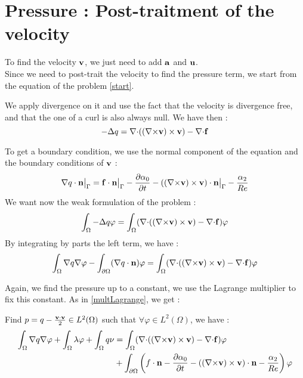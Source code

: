 \section{Pressure : Post-traitment of the velocity}
\label{pressure}
To find the velocity ${\mathbf{v}}$, we just need to add ${\mathbf{a}}$ and ${\mathbf{u}}$.\\
Since we need to post-trait the velocity to find the pressure term, we start from the equation of the problem \ref{start}.

We apply divergence on it and use the fact that the velocity is divergence free, and that the one of a curl is also always null. We have then :
\begin{equation*}
-{\Delta} q = {\nabla\cdot}(({\nabla\times} {\mathbf{v}})\times {\mathbf{v}}) - {\nabla\cdot} {\mathbf{f}}
\end{equation*}

To get a boundary condition, we use the normal component of the equation and the boundary conditions of ${\mathbf{v}}$ :
\[ {\nabla} q\cdot {\mathbf{n}}{\big\rvert_{\Gamma}} =  {\mathbf{f}}\cdot {\mathbf{n}}{\big\rvert_{\Gamma}} - \frac{\partial\alpha_0}{\partial t} - (({\nabla\times} {\mathbf{v}})\times {\mathbf{v}})\cdot {\mathbf{n}}{\big\rvert_{\Gamma}} - \frac{\alpha_2}{Re} \]
We want now the weak formulation of the problem :
\[ \int_\Omega -{\Delta} q\varphi = \int_\Omega ({\nabla\cdot}(({\nabla\times} {\mathbf{v}})\times {\mathbf{v}}) -{\nabla\cdot} {\mathbf{f}})\varphi \]
By integrating by parts the left term, we have :
\[ \int_\Omega {\nabla} q{\nabla}\varphi - \int_{\partial\Omega} ({\nabla} q\cdot {\mathbf{n}})\varphi = \int_\Omega ({\nabla\cdot}(({\nabla\times} {\mathbf{v}})\times {\mathbf{v}}) -{\nabla\cdot} {\mathbf{f}})\varphi \]

Again, we find the pressure up to a constant, we use the Lagrange multiplier to fix this constant. As in \ref{multLagrange}, we get :
\begin{pb}\label{fvq}
Find $p=q-\frac{{\mathbf{v}}\cdot{\mathbf{v}}}{2} \in L^2(\Omega)$ such that $\forall \varphi\in L^2(\Omega)$, we have :
\begin{align*}
\int_\Omega {\nabla} q{\nabla}\varphi + \int_\Omega \lambda\varphi + \int_\Omega q\nu &= \int_\Omega ({\nabla\cdot}(({\nabla\times} {\mathbf{v}})\times {\mathbf{v}}) -{\nabla\cdot} {\mathbf{f}})\varphi\\
&+ \int_{\partial\Omega} \left(f\cdot {\mathbf{n}} - \frac{\partial\alpha_0}{\partial t} - (({\nabla\times} {\mathbf{v}})\times {\mathbf{v}})\cdot {\mathbf{n}} - \frac{\alpha_2}{Re}\right)\varphi
\end{align*}\end{pb}

